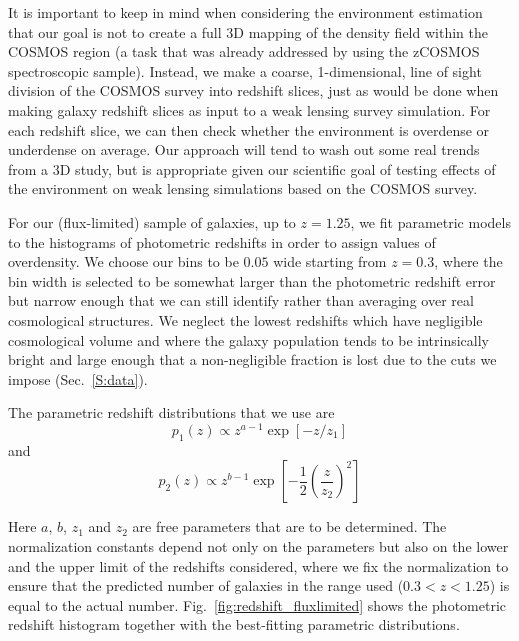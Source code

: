 \documentclass[twocolumn,useAMS,usenatbib]{mn2e}
\begin{document}
It is important to keep in mind when considering the environment
estimation that our goal is not to create a full 3D mapping of the
density field within the COSMOS region (a task that was already
addressed by \citealt{Kovac_Density10k} using the zCOSMOS
spectroscopic sample).  Instead, we make a coarse, 1-dimensional, line of sight division of the
COSMOS survey into redshift slices, just as would be done when making
galaxy redshift slices as input to a weak lensing survey simulation.
For each redshift slice, we can then check whether the environment is
overdense or underdense on average.  Our approach will tend to wash
out some real trends from a 3D study, but is appropriate given our
scientific goal of testing effects of the environment on weak lensing
simulations based on the COSMOS survey.

For our (flux-limited) sample of galaxies, up to $z=1.25$, we fit
parametric models to the histograms of photometric redshifts in order
to assign values of overdensity.  We choose our bins to be $0.05$ wide
starting from $z=0.3$, where the bin width is selected to be somewhat
larger than the photometric redshift error but narrow enough that we
can still identify rather than averaging over real cosmological
structures.  We neglect the lowest
redshifts which have negligible cosmological volume and where the
galaxy population tends to be intrinsically bright and large enough
that a non-negligible fraction is lost due to the cuts we impose
(Sec.~\ref{S:data}).

The parametric redshift distributions that we use are
\begin{equation}\label{E:pz1}
 p_1(z) \propto z^{a-1}\exp\left[{-z/z_1}\right]
\end{equation}
and 
\begin{equation}\label{E:pz2}
 p_2(z) \propto z^{b-1}\exp\left[ -\frac{1}{2}\left( \frac{z}{z_2} \right)^2\right]
\end{equation}

Here $a$, $b$, $z_1$ and
$z_2$ are free parameters that are to be determined.  The
normalization constants depend not only on the parameters but also on
the lower and the upper limit of the redshifts considered, where we
fix the normalization to ensure that the predicted number of galaxies
in the range used ($0.3<z<1.25$) is equal to the actual number. 
Fig.~\ref{fig:redshift_fluxlimited} shows the photometric redshift
histogram together with the best-fitting parametric distributions.
\end{document}
